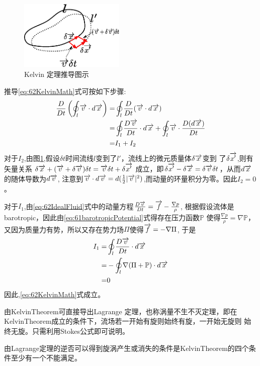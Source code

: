 \begin{figure}[!ht]
 \centering
 \includegraphics[width=5cm]{KelvinTheorem.eps}
 \caption{Kelvin 定理推导图示}\label{fig:62Kelvin}
\end{figure}
推导\eqref{eq:62KelvinMath}式可按如下步骤:
\begin{align*}
\frac{D}{Dt} \left(\oint_{l}\overrightarrow{v}\cdot d\overrightarrow{x}\right)= &  \oint_{l}\frac{D}{Dt}(\overrightarrow{v}\cdot d\overrightarrow{x})\\
=& \oint_{l}\frac{D \overrightarrow{v}}{Dt} \cdot d\overrightarrow{x} +\oint_l \overrightarrow{v}\cdot \frac{D(d\overrightarrow{x})}{Dt}\\
=& I_1+I_2
\end{align*}
对于$I_2$,由图\ref{fig:62Kelvin},假设$\delta t$时间流线$l$变到了$l'$，流线上的微元质量体$\delta \overrightarrow{x}$变到
了$\delta \overrightarrow{x'}$,则有矢量关系
$\delta \overrightarrow{x}+(\overrightarrow{v}+\delta \overrightarrow{v})\delta t = \overrightarrow{v}\delta t+\delta \overrightarrow{x'}$
成立，即$\delta \overrightarrow{x'}-\delta \overrightarrow{x}=\delta \overrightarrow{v} \delta t$，从而$d\overrightarrow{x}$的随体导数为$ d\overrightarrow{v}$,
注意到$\overrightarrow{v}\cdot d\overrightarrow{v}=d(\frac{1}{2}|\overrightarrow{v}|^2)$,而动量的环量积分为零。因此$I_2=0$。

对于$I_1$,由\eqref{eq:62IdealFluid}式中的动量方程$\frac{D \overrightarrow{v}}{Dt}=\overrightarrow{f}-\frac{\nabla p}{\rho}$,
根据假设流体是\gls{barotropic}，因此由\eqref{eq:61barotropicPotential}式得存在压力函数$\mathbb{P}$
使得$\frac{\nabla p}{\rho}=\nabla \mathbb{P}$，又因为质量力有势，所以又存在势力场$\Pi$使得$\overrightarrow{f}=-\nabla \Pi$,
于是
\begin{align*}
I_1 = & \oint_{l}\frac{D \overrightarrow{v}}{Dt} \cdot d\overrightarrow{x}\\
= & -\oint_{l}\nabla(\Pi + \mathbb{P})\cdot d\overrightarrow{x}\\
= & 0
\end{align*}
因此,\eqref{eq:62KelvinMath}式成立。

由\gls{KelvinTheorem}可直接导出Lagrange 定理，也称涡量不生不灭定理，即在\gls{KelvinTheorem}成立的条件下，流场若一开始有旋则始终有旋，一开始无旋则
始终无旋。只需利用Stokes公式即可说明。

由Lagrange定理的逆否可以得到旋涡产生或消失的条件是\gls{KelvinTheorem}的四个条件至少有一个不能满足。


